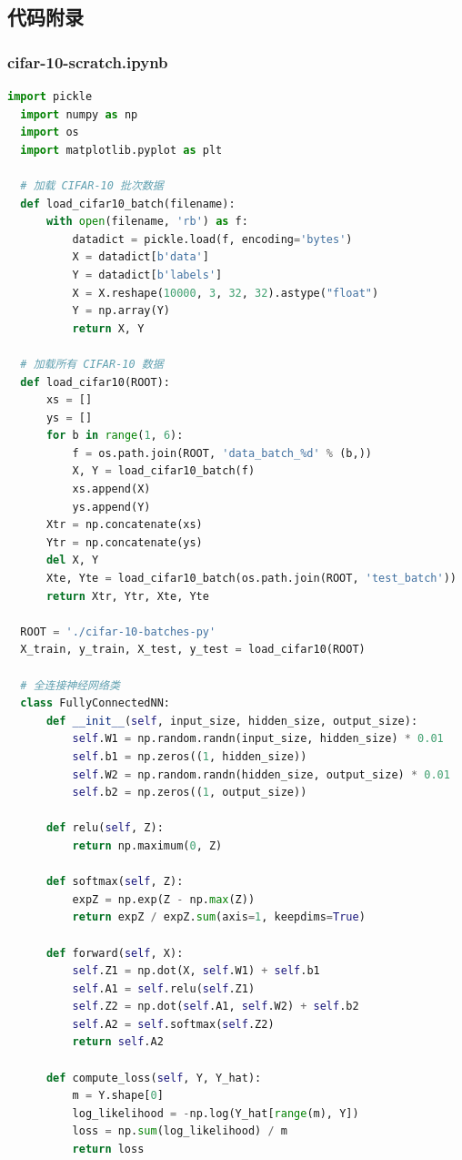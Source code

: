 \documentclass[12pt]{article}
\begin{document}
\subsection{代码附录}

\subsubsection{cifar-10-scratch.ipynb}
\begin{lstlisting}[language=Python]
  import pickle
  import numpy as np
  import os
  import matplotlib.pyplot as plt
  
  # 加载 CIFAR-10 批次数据
  def load_cifar10_batch(filename):
      with open(filename, 'rb') as f:
          datadict = pickle.load(f, encoding='bytes')
          X = datadict[b'data']
          Y = datadict[b'labels']
          X = X.reshape(10000, 3, 32, 32).astype("float")
          Y = np.array(Y)
          return X, Y
  
  # 加载所有 CIFAR-10 数据
  def load_cifar10(ROOT):
      xs = []
      ys = []
      for b in range(1, 6):
          f = os.path.join(ROOT, 'data_batch_%d' % (b,))
          X, Y = load_cifar10_batch(f)
          xs.append(X)
          ys.append(Y)
      Xtr = np.concatenate(xs)
      Ytr = np.concatenate(ys)
      del X, Y
      Xte, Yte = load_cifar10_batch(os.path.join(ROOT, 'test_batch'))
      return Xtr, Ytr, Xte, Yte
  
  ROOT = './cifar-10-batches-py'
  X_train, y_train, X_test, y_test = load_cifar10(ROOT)
  
  # 全连接神经网络类
  class FullyConnectedNN:
      def __init__(self, input_size, hidden_size, output_size):
          self.W1 = np.random.randn(input_size, hidden_size) * 0.01
          self.b1 = np.zeros((1, hidden_size))
          self.W2 = np.random.randn(hidden_size, output_size) * 0.01
          self.b2 = np.zeros((1, output_size))
  
      def relu(self, Z):
          return np.maximum(0, Z)
  
      def softmax(self, Z):
          expZ = np.exp(Z - np.max(Z))
          return expZ / expZ.sum(axis=1, keepdims=True)
  
      def forward(self, X):
          self.Z1 = np.dot(X, self.W1) + self.b1
          self.A1 = self.relu(self.Z1)
          self.Z2 = np.dot(self.A1, self.W2) + self.b2
          self.A2 = self.softmax(self.Z2)
          return self.A2
  
      def compute_loss(self, Y, Y_hat):
          m = Y.shape[0]
          log_likelihood = -np.log(Y_hat[range(m), Y])
          loss = np.sum(log_likelihood) / m
          return loss
  

\end{lstlisting}
\end{document}
